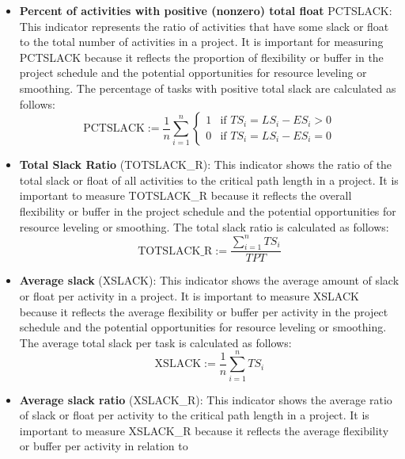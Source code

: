 \documentclass[preprint,
3p]{elsarticle} %
\begin{document}
\begin{appendices}
\begin{itemize}
  (earliest) start time, and \(TS_i:=LS_i-ES_i\) is the total slack of
  task \(i\); \(l_{ii}=[\mathbf{LD}]\) is the diagonal value of the
  logic domain.
\item
  \textbf{Percent of activities with positive (nonzero) total float}
  PCTSLACK: This indicator represents the ratio of activities that have
  some slack or float to the total number of activities in a project. It
  is important for measuring PCTSLACK because it reflects the proportion
  of flexibility or buffer in the project schedule and the potential
  opportunities for resource leveling or smoothing. The percentage of
  tasks with positive total slack are calculated as follows:
  \begin{equation}
  \text{PCTSLACK}:=\frac{1}{n} \sum\limits_{i=1}^n\begin{cases} 1 & \text{if $TS_i=LS_i-ES_i > 0$} \\ 
  0 & \text{if $TS_i=LS_i-ES_i = 0$}\end{cases}
  \end{equation}
\item
  \textbf{Total Slack Ratio} (TOTSLACK\_R): This indicator shows the
  ratio of the total slack or float of all activities to the critical
  path length in a project. It is important to measure TOTSLACK\_R
  because it reflects the overall flexibility or buffer in the project
  schedule and the potential opportunities for resource leveling or
  smoothing. The total slack ratio is calculated as follows:
  \begin{equation}
  \label{eq:TOTSLACK_R}
  \text{TOTSLACK\_R}:=\frac{\sum\limits_{i=1}^n TS_i}{TPT}
  \end{equation}
\item
  \textbf{Average slack} (XSLACK): This indicator shows the average
  amount of slack or float per activity in a project. It is important to
  measure XSLACK because it reflects the average flexibility or buffer
  per activity in the project schedule and the potential opportunities
  for resource leveling or smoothing. The average total slack per task
  is calculated as follows: \begin{equation}
  \label{eq:XSLACK}
  \text{XSLACK}:=\frac{1}{n} \sum\limits_{i=1}^n TS_i
  \end{equation}
\item
  \textbf{Average slack ratio} (XSLACK\_R): This indicator shows the
  average ratio of slack or float per activity to the critical path
  length in a project. It is important to measure XSLACK\_R because it
  reflects the average flexibility or buffer per activity in relation to

\end{itemize}
\end{appendices}
\end{document}
